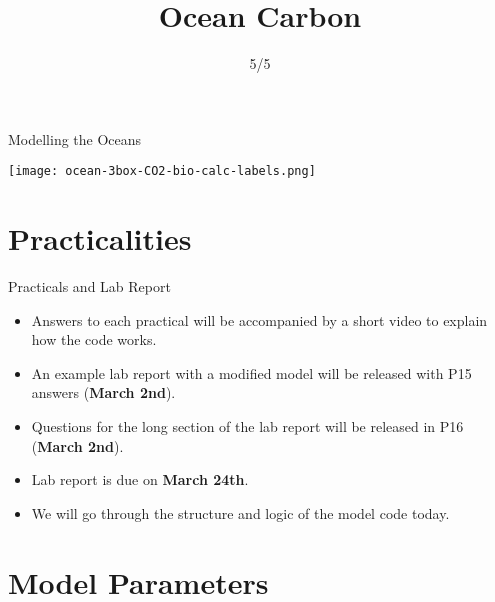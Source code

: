 

\title{Ocean Carbon}
\author{5/5}



\begin{frame}{Modelling the Oceans}
    
    \texttt{[image: ocean-3box-CO2-bio-calc-labels.png]}
        
\end{frame}

\section{Practicalities}

\begin{frame}{Practicals and Lab Report}
    
    \begin{itemize}
        \item Answers to each practical will be accompanied by a short video to explain how the code works.
        \item An example lab report with a modified model will be released with P15 answers (\textbf{March 2nd}).
        \item Questions for the long section of the lab report will be released in P16 (\textbf{March 2nd}).
        \item Lab report is due on \textbf{March 24th}.
        \item We will go through the structure and logic of the model code today.
    \end{itemize}
        
\end{frame}

\section{Model Parameters}

